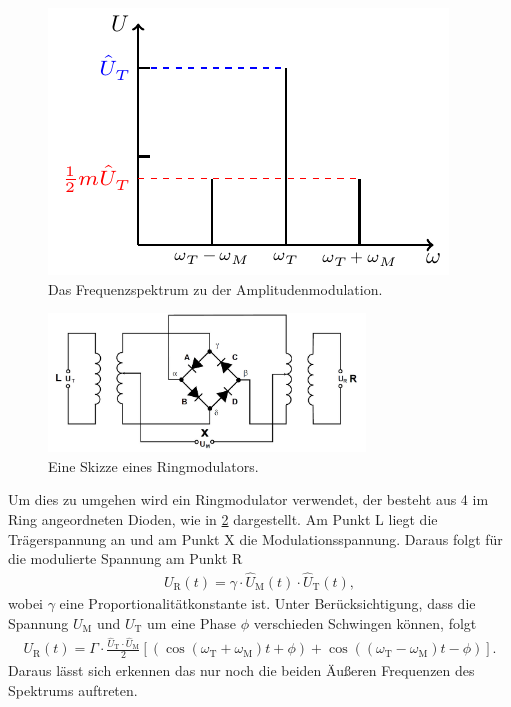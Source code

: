 \begin{figure}
	\centering
	\includegraphics[width =\textwidth/2]{../Grafiken/tikz/tikz-Frequenzspektrum.pdf}
	\caption{Das Frequenzspektrum zu der Amplitudenmodulation.\label{fig:Frequenzspektrum} }
\end{figure}
\newpage
\begin{figure}
	\centering
	\includegraphics[width = 0.75\textwidth]{../Grafiken/Ringmodulator.pdf}
	\caption{Eine Skizze eines Ringmodulators.\cite{V59}\label{fig:Ringmodulator}}
\end{figure}
Um dies zu umgehen wird ein Ringmodulator verwendet, der besteht aus 4 im Ring angeordneten Dioden, wie in \cref{fig:Ringmodulator} dargestellt.
Am Punkt L liegt die Trägerspannung an und am Punkt X die Modulationsspannung.
Daraus folgt für die modulierte Spannung am Punkt R
\begin{align}
	U_\text{R}(t)=\gamma\cdot \hat U_\text{M}(t) \cdot\hat U_\text{T}(t),
\end{align}
wobei $\gamma$ eine Proportionalitätkonstante ist. Unter Berücksichtigung, dass die Spannung $U_\text{M}$ und $U_\text{T}$ um eine Phase $\phi$ verschieden Schwingen können, folgt
\begin{align}
	U_\text{R}(t)=\Gamma\cdot \frac{\hat U_\text{T}\cdot\hat U_\text{M}}{2}\left[ \left(\cos\left(\omega_\text{T}+\omega_\text{M}\right)t+\phi\right) +\cos\left(\left(\omega_\text{T}-\omega_\text{M}\right)t-\phi\right) \right].
	\label{eq:amplituden_moduliert_ohne_traeger}
\end{align}
Daraus lässt sich erkennen das nur noch die beiden Äußeren Frequenzen des Spektrums auftreten.


